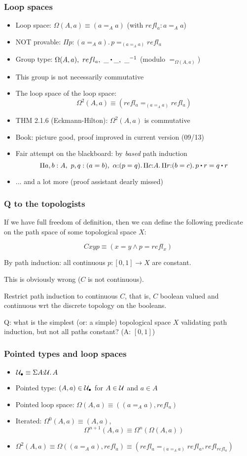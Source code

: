 \documentclass[handout]{beamer}
\newcommand{\depi}[3]{\Pi{#1{:}#2.\,#3}}
\newcommand{\sigm}[3]{\Sigma{#1{:}#2.\,#3}}
\newcommand{\UU}{{\cal U}}
\newcommand{\ct}{%
  \mathchoice{\mathbin{\raisebox{0.5ex}{$\displaystyle\centerdot$}}}%
             {\mathbin{\raisebox{0.5ex}{$\centerdot$}}}%
             {\mathbin{\raisebox{0.25ex}{$\scriptstyle\,\centerdot\,$}}}%
             {\mathbin{\raisebox{0.1ex}{$\scriptscriptstyle\,\centerdot\,$}}}
}
\newcommand{\opp}[1]{\mathord{{#1}^{-1}}}
\begin{document}
\frame
  {

    \frametitle{Loop spaces}

    \begin{itemize}[<+->]
    \item Loop space: $\Omega(A,a)\equiv (a=_A a)$ (with $refl_a: a=_A a$)
    \item NOT provable: $\depi{p}{(a=_A a)}{p=_{(a=_A a)}refl_a}$
    \item Group type: $\Omega(A,a),~refl_a,~\_\ct\_,~\opp\_$ (modulo $=_{\Omega(A,a)}$)
    \item This group is not necessarily commutative
    \item The loop space of the loop space: $$\Omega^2(A,a)\equiv (refl_a =_{(a=_A a)} refl_a)$$
    \item THM 2.1.6 (Eckmann-Hilton): $\Omega^2(A,a)$ is commutative
    \item Book: picture good, proof improved in current version (09/13)
    \item Fair attempt on the blackboard: by \emph{based} path induction
$$\depi{a,b:A,~p,q:(a=b),~\alpha}{(p=q)}{\depi{c}{A}{\depi{r}{(b=c)}{p\ct r = q\ct r}}}$$
    \item ... and a lot more (proof assistant dearly missed)
    \end{itemize}
  }

\frame
  {

    \frametitle{Q to the topologists}

If we have full freedom of definition, then we can define the following predicate on the path space of some topological space $X$:

$$Cxyp \equiv  (x=y \land p=refl_x)$$

By path induction: all continuous $p: [0,1] \to X$ are constant.

This is obviously wrong ($C$ is not continuous).

Restrict path induction to continuous $C$, that is, $C$ boolean valued and continuous wrt the discrete topology on the booleans.

Q: what is the simplest (or: a simple) topological space $X$ validating path induction, but not all paths constant? (A: $[0,1]$)
}

\frame
  {

    \frametitle{Pointed types and loop spaces}

    \begin{itemize}[<+->]
    \item $\UU_\bullet \equiv \sigm{A}{\UU}{A}$    
    \item Pointed type: $(A,a) \in \UU_\bullet$ for $A\in \UU$ and $a\in A$
    \item Pointed loop space: $\Omega(A,a)\equiv ((a=_A a),refl_a)$ 
    \item Iterated: $\Omega^0(A,a)\equiv (A,a)$,  $$\Omega^{n+1}(A,a)\equiv \Omega^n(\Omega(A,a))$$
    \item $\Omega^2(A,a)\equiv \Omega((a=_A a),refl_a) \equiv (refl_a=_{(a=_A a)} refl_a, refl_{refl_a})$
    \end{itemize}
  }
\end{document}
